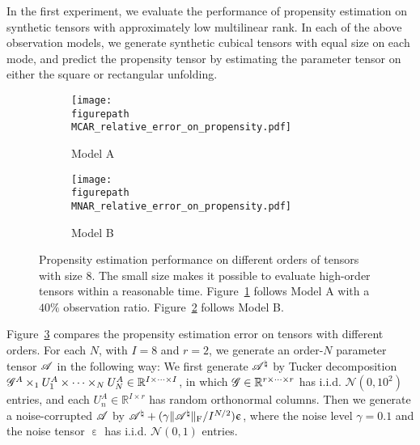 \documentclass{article}
\newcommand{\T}[2][]{#1\mathscr{\MakeUppercase{#2}}}
\newcommand{\RR}{\mathbb{R}}
\newcommand{\norm}[1]{\Vert #1 \Vert}
\newcommand{\fnorm}[1]{\norm{#1}_{\mathrm{F}}}
\theoremstyle{plain}
\def \figurepath {figures/}
\begin{document}
In the first experiment, we evaluate the performance of propensity estimation on synthetic tensors with approximately low multilinear rank.
In each of the above observation models, we generate synthetic cubical tensors with equal size on each mode, and predict the propensity tensor by estimating the parameter tensor on either the square or rectangular unfolding.
\begin{figure}[t]
	\centering
	\begin{minipage}[b]{0.46\linewidth}
		\begin{subfigure}[t]{.45\linewidth}
		\texttt{[image: \\figurepath MCAR\_relative\_error\_on\_propensity.pdf]}
		\caption{Model A}
		\label{fig:MCAR_relative_error_on_propensity}
	\end{subfigure}	
	\hspace{.05\linewidth}
			\begin{subfigure}[t]{.46\linewidth}
		\texttt{[image: \\figurepath MNAR\_relative\_error\_on\_propensity.pdf]}
		\caption{Model B}
	\label{fig:MNAR_relative_error_on_propensity}
	\end{subfigure}	
\end{minipage}
\begin{minipage}[b]{.42\linewidth}
\end{minipage}
	\caption{Propensity estimation performance on different orders of tensors with size 8.
		The small size makes it possible to evaluate high-order tensors within a reasonable time.
		Figure~\ref{fig:MCAR_relative_error_on_propensity} follows Model A with a $40\%$ observation ratio.
		Figure~\ref{fig:MNAR_relative_error_on_propensity} follows Model B.
	}
	\label{fig:MNAR_propensity}
\end{figure}
Figure~\ref{fig:MNAR_propensity} compares the propensity estimation error on tensors with different orders.
For each $N$, with $I=8$ and $r=2$, we generate an order-$N$ parameter tensor $\T{A}$ in the following way: We first generate $\T{A}^\natural$ by Tucker decomposition $\T{G}^A \times_1 U^A_1 \times \cdots \times_N U^A_N \in \RR^{I \times \cdots \times I}$, in which $\T{G} \in \RR^{r \times \cdots \times r}$ has i.i.d. $\mathcal{N}(0, 10^2)$ entries, and each $U^A_n \in \RR^{I \times r}$ has random orthonormal columns.
Then we generate a noise-corrupted $\T{A}$ by $\T{A}^\natural + (\gamma \fnorm{\T{A}^\natural} / I^{N/2})\upepsilon$, where the noise level $\gamma = 0.1$ and the noise tensor $\upepsilon$ has i.i.d. $\mathcal{N}(0,1)$ entries.
\end{document}
